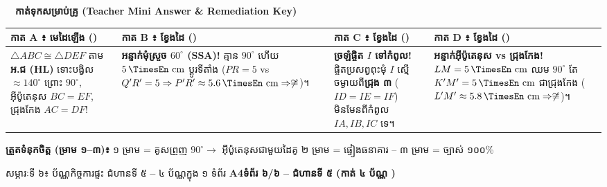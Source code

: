 \documentclass[a4paper,10pt]{article}
\newcommand{\en}[1]{{\TimesEn #1}}
\newcommand{\enbf}[1]{{\TimesEn\bfseries #1}}
\newcommand{\unit}[1]{\,\text{\en{#1}}}
\newcommand{\cnum}[1]{\mbox{\fontsize{10pt}{12pt}\selectfont\ding{\numexpr181+#1\relax}}}
\newcommand{\scissors}{\ding{34}}
\newcommand{\tri}[1]{\ensuremath{\triangle #1}}
\newcommand{\cg}{\ensuremath{\cong}}
\newcommand{\ncg}{\ensuremath{\not\cong}}
\newcommand{\pagebanner}[2]{%
  \begin{tcolorbox}[
    enhanced, sharp corners, colback=headgray, colframe=black,
    boxrule=1.1pt, boxsep=1pt, top=3pt, bottom=3pt, left=6pt, right=6pt,
    after skip=4pt
  ]
    {\muol\fontsize{9.4pt}{14pt}\selectfont #1}\hfill{\fontsize{8.0pt}{11.5pt}\selectfont\textbf{#2}}
  \end{tcolorbox}%
}
\begin{document}
\vspace{6pt}

\noindent\scissors\ \dotfill\ \textbf{កាត់ទុកសម្រាប់គ្រូ (\en{Teacher Mini Answer \& Remediation Key})} \dotfill\ \scissors

\vspace{4pt}
\begin{tcolorbox}[
  enhanced, sharp corners, colback=panelgray, colframe=black,
  boxrule=1.0pt, boxsep=1pt, top=4pt, bottom=4pt, left=5pt, right=5pt
]
  \fontsize{7.7pt}{10.8pt}\selectfont
  \renewcommand{\arraystretch}{1.10}
  \begin{tabular}{|L{4.05cm}|L{4.25cm}|L{4.25cm}|L{4.45cm}|}
    \hline
    \textbf{កាត \en{A} ៖ មេដៃឡើង ()} &
    \textbf{កាត \en{B} ៖ ខ្វែងដៃ ()} &
    \textbf{កាត \en{C} ៖ ខ្វែងដៃ ()} &
    \textbf{កាត \en{D} ៖ ខ្វែងដៃ ()} \\ \hline
    $\tri{ABC}\cg\tri{DEF}$ តាម \textbf{អ.ជ (\en{HL})} ទោះបង្វិល $\approx 140^\circ$ ព្រោះ $90^\circ$, អ៊ីប៉ូតេនុស $BC=EF$, ជ្រុងកែង $AC=DF$! &
    \textbf{អន្ទាក់មុំស្រួច $60^\circ$ (\en{SSA})!} គ្មាន $90^\circ$ ហើយ $5\unit{cm}$ ប្ដូរទីតាំង ($PR=5$ \en{vs} $Q'R'=5 \Rightarrow P'R'\approx 5.6\unit{cm} \Rightarrow \ncg$)។ &
    \textbf{ច្រឡំផ្ចិត $I$ ទៅកំពូល!} ផ្ចិតប្រសព្វពុះមុំ $I$ ស្មើចម្ងាយពី\textbf{ជ្រុង ៣} ($ID=IE=IF$) មិនមែនពីកំពូល $IA,IB,IC$ ទេ។ &
    \textbf{អន្ទាក់អ៊ីប៉ូតេនុស \en{vs} ជ្រុងកែង!} $LM=5\unit{cm}$ ឈម $90^\circ$ តែ $K'M'=5\unit{cm}$ ជាជ្រុងកែង ($L'M'\approx 5.8\unit{cm} \Rightarrow \ncg$)។ \\ \hline
  \end{tabular}
  \par\vspace{2.5pt}
  \textbf{ត្រួតទំនុកចិត្ត (ម្រាម ១\en{--}៣)៖} ១ ម្រាម = គូសព្រួញ $90^\circ \to$ អ៊ីប៉ូតេនុសជាមួយដៃគូ \hspace{0.2cm}\en{|}\hspace{0.2cm} ២ ម្រាម = ផ្ទៀងធនាគារ \cnum{1}--\cnum{5} \hspace{0.2cm}\en{|}\hspace{0.2cm} ៣ ម្រាម = ច្បាស់ ១០០\%
\end{tcolorbox}

\clearpage

\pagebanner{សម្ភារៈទី ៦៖ ប័ណ្ណកិច្ចការផ្ទះ ជំហានទី ៥ \enbf{--} ៤ ប័ណ្ណក្នុង ១ ទំព័រ \enbf{A4}}{ទំព័រ ៦/៦ \en{--} ជំហានទី ៥ (កាត់ ៤ ប័ណ្ណ \scissors)}
\end{document}
